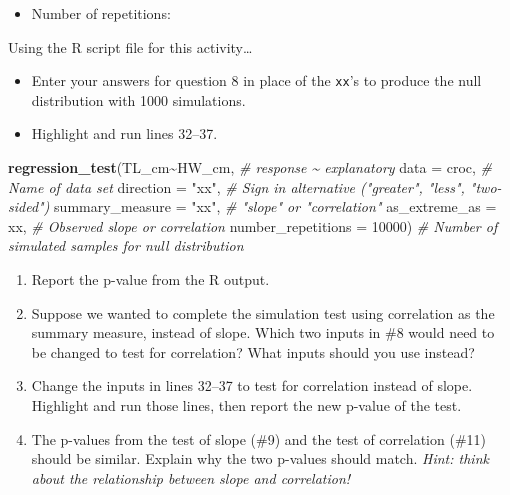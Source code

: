 \documentclass[
]{report}
\newenvironment{Shaded}{\begin{snugshade}}{\end{snugshade}}
\newcommand{\AttributeTok}[1]{\textcolor[rgb]{0.13,0.29,0.53}{#1}}
\newcommand{\CommentTok}[1]{\textcolor[rgb]{0.56,0.35,0.01}{\textit{#1}}}
\newcommand{\DecValTok}[1]{\textcolor[rgb]{0.00,0.00,0.81}{#1}}
\newcommand{\FunctionTok}[1]{\textcolor[rgb]{0.13,0.29,0.53}{\textbf{#1}}}
\newcommand{\NormalTok}[1]{#1}
\newcommand{\SpecialCharTok}[1]{\textcolor[rgb]{0.81,0.36,0.00}{\textbf{#1}}}
\newcommand{\StringTok}[1]{\textcolor[rgb]{0.31,0.60,0.02}{#1}}
\providecommand{\tightlist}{%
  \setlength{\itemsep}{0pt}\setlength{\parskip}{0pt}}
\begin{document}
\vspace{0.2in}

\begin{itemize}
\tightlist
\item
  Number of repetitions:
\end{itemize}

\vspace{.2in}

Using the R script file for this activity\ldots{}

\begin{itemize}
\item
  Enter your answers for question 8 in place of the \texttt{xx}'s to produce the null distribution with 1000 simulations.
\item
  Highlight and run lines 32--37.
\end{itemize}

\begin{Shaded}
\begin{Highlighting}[]
\FunctionTok{regression\_test}\NormalTok{(TL\_cm}\SpecialCharTok{\textasciitilde{}}\NormalTok{HW\_cm, }\CommentTok{\# response \textasciitilde{} explanatory}
               \AttributeTok{data =}\NormalTok{ croc, }\CommentTok{\# Name of data set}
               \AttributeTok{direction =} \StringTok{"xx"}\NormalTok{, }\CommentTok{\# Sign in alternative ("greater", "less", "two{-}sided")}
               \AttributeTok{summary\_measure =} \StringTok{"xx"}\NormalTok{, }\CommentTok{\# "slope" or "correlation"}
               \AttributeTok{as\_extreme\_as =}\NormalTok{ xx, }\CommentTok{\# Observed slope or correlation}
               \AttributeTok{number\_repetitions =} \DecValTok{10000}\NormalTok{) }\CommentTok{\# Number of simulated samples for null distribution}
\end{Highlighting}
\end{Shaded}

\begin{enumerate}
\def\labelenumi{\arabic{enumi}.}
\setcounter{enumi}{8}
\item
  Report the p-value from the R output.
  \vspace{0.5in}
\item
  Suppose we wanted to complete the simulation test using correlation as the summary measure, instead of slope. Which two inputs in \#8 would need to be changed to test for correlation? What inputs should you use instead?
  \vspace{0.75in}
\item
  Change the inputs in lines 32--37 to test for correlation instead of slope. Highlight and run those lines, then report the new p-value of the test.
  \vspace{0.5in}
\item
  The p-values from the test of slope (\#9) and the test of correlation (\#11) should be similar. Explain why the two p-values should match. \emph{Hint: think about the relationship between slope and correlation!}
  \vspace{1in}
\end{enumerate}
\end{document}
